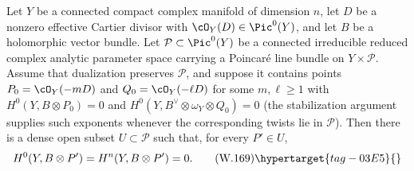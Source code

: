 
\begin{lemma}
\hypertarget{tag-03IA}{}\label{wbII:lem:generic-endpoints}


Let $Y$ be a connected compact complex manifold of dimension $n$, let $D$ be
a nonzero effective Cartier divisor with $\cO_Y(D)\in\Pic^0(Y)$, and let
$B$ be a holomorphic vector bundle.  Let $\mathcal P\subset\Pic^0(Y)$ be a
connected irreducible reduced complex analytic parameter space carrying a
Poincar\'e line bundle on $Y\times\mathcal P$.  Assume that dualization
preserves $\mathcal P$, and suppose it
  contains points $P_0=\cO_Y(-mD)$ and $Q_0=\cO_Y(-\ell D)$ for some
  $m,\ell\ge1$ with
  $H^0(Y,B\otimes P_0)=0$ and
  $H^0(Y,B^\vee\otimes\omega_Y\otimes Q_0)=0$ (the stabilization argument
  supplies such exponents whenever the corresponding twists lie in
  $\mathcal P$).  Then there is a dense open subset
$U\subset\mathcal P$ such that, for every $P'\in U$,
\[
 H^0(Y,B\otimes P')=H^n(Y,B\otimes P')=0.
 \tag{W.169}\hypertarget{tag-03E5}{}\label{wbII:eq:CN:5.2}
\]
\end{lemma}

